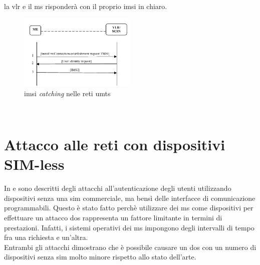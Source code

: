 la \gls{vlr} e il \gls{ms} risponderà con il proprio \gls{imsi} in chiaro.
\begin{figure}[h]
    \centering
    \includegraphics[width=0.5\textwidth]{images/imsi-catch-umts.png}
    \caption{\gls{imsi} \textit{catching} nelle reti \gls{umts}\cite{dos-imsi}}
\end{figure}\\

\clearpage

\section{Attacco alle reti con dispositivi SIM-less}
In \cite{umts-dos} e \cite{gsm-dos-simless} sono descritti degli attacchi all'autenticazione degli utenti utilizzando dispositivi senza una \gls{sim} commerciale, ma bensì delle interfacce di comunicazione 
programmabili. Questo è stato fatto perchè utilizzare dei \gls{ms} come dispositivi per effettuare un attacco \gls{dos} rappresenta un fattore limitante in termini di prestazioni. Infatti, 
i sistemi operativi dei \gls{ms} impongono degli intervalli di tempo fra una richiesta e un'altra.\\
Entrambi gli attacchi dimostrano che è possibile causare un \gls{dos} con un numero di dispositivi senza \gls{sim} molto minore rispetto allo stato dell'arte. 
